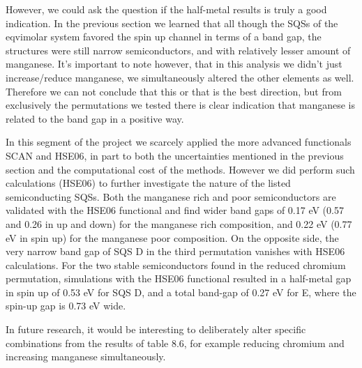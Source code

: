 However, we could ask the question if the half-metal results is truly a good indication. In the previous section we learned that all though the SQSs of the eqvimolar system favored the spin up channel in terms of a band gap, the structures were still narrow semiconductors, and with relatively lesser amount of manganese. It's important to note however, that in this analysis we didn't just increase/reduce manganese, we simultaneously altered the other elements as well. Therefore we can not conclude that this or that is the best direction, but from exclusively the permutations we tested there is clear indication that manganese is related to the band gap in a positive way.  

In this segment of the project we scarcely applied the more advanced functionals SCAN and HSE06,  in part to both the uncertainties mentioned in the previous section and the computational cost of the methods. However we did perform such calculations (HSE06) to further investigate the nature of the listed semiconducting SQSs. Both the manganese rich and poor semiconductors are validated with the HSE06 functional and find wider band gaps of 0.17 eV (0.57 and 0.26 in up and down) for the manganese rich composition, and 0.22 eV (0.77 eV in spin up) for the manganese poor composition. On the opposite side, the very narrow band gap of SQS D in the third permutation vanishes with HSE06 calculations. For the two stable semiconductors found in the reduced chromium permutation, simulations with the HSE06 functional resulted in a half-metal gap in spin up of 0.53 eV for SQS D, and a total band-gap of 0.27 eV for E, where the spin-up gap is 0.73 eV wide. 

In future research, it would be interesting to deliberately alter specific combinations from the results of table 8.6, for example reducing chromium and increasing manganese simultaneously.   



